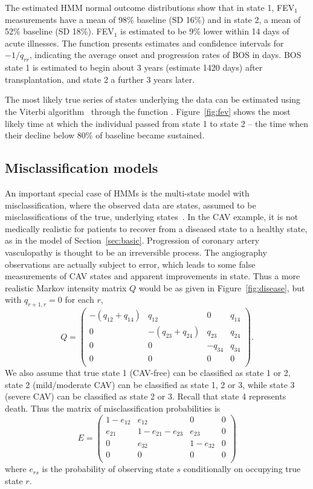 \documentclass[article,shortnames]{jss}
\begin{document}
The estimated HMM normal outcome distributions show that in state 1,
FEV$_1$ measurements have a mean of 98\% baseline (SD 16\%) and in
state 2, a mean of 52\% baseline (SD 18\%).  FEV$_1$ is estimated to
be 9\% lower within 14 days of acute illnesses.  The function
 presents estimates and confidence intervals for $-1
/ q_{rr}$, indicating the average onset and progression rates of BOS
in days.  BOS state 1 is estimated to begin about 3 years (estimate
1420 days) after transplantation, and state 2 a further 3 years later.

The most likely true series of states underlying the data can be
estimated using the Viterbi algorithm~\citep{viterbi} through the
function .  Figure~\ref{fig:fev} shows the most
likely time at which the individual passed from state 1 to state 2 --
the time when their decline below 80\% of baseline became sustained.


\subsection{Misclassification models}
\label{sec:misc}

An important special case of HMMs is the multi-state model with
misclassification, where the observed data are states, assumed to be
misclassifications of the true, underlying
states~\citep{jackson03:_multis_markov}.  In the CAV example, it is
not medically realistic for patients to recover from a diseased state
to a healthy state, as in the model of Section~\ref{sec:basic}.
Progression of coronary artery vasculopathy is thought to be an
irreversible process.  The angiography observations are actually
subject to error, which leads to some false measurements of CAV states
and apparent improvements in state.  Thus a more realistic Markov
intensity matrix $Q$ would be as given in Figure~\ref{fig:disease},
but with $q_{r+1,r} = 0$ for each $r$,
\[
Q = \left(
  \begin{array}{llll}
    -(q_{12} + q_{14}) & q_{12} &  0     & q_{14}\\
      0    & -(q_{23}+q_{24}) & q_{23} & q_{24}\\
      0    &   0    & -q_{34} & q_{34}\\
      0    &   0    &   0    &   0   \\
  \end{array}
\right ).
\]
We also assume that true state 1 (CAV-free) can be classified as state
1 or 2, state 2 (mild/moderate CAV) can be classified as state 1, 2 or
3, while state 3 (severe CAV) can be classified as state 2 or 3.
Recall that state 4 represents death.  Thus the matrix of
misclassification probabilities is
\[
E = \left(
  \begin{array}{llll}
    1 - e_{12} & e_{12} & 0 & 0 \\
    e_{21} & 1 - e_{21} - e_{23} & e_{23} & 0 \\
    0 & e_{32} & 1 - e_{32} & 0 \\
    0 & 0 & 0 & 0\\
  \end{array}
  \right)
\]
where $e_{rs}$ is the probability of observing state $s$ conditionally
on occupying true state $r$.
\end{document}
